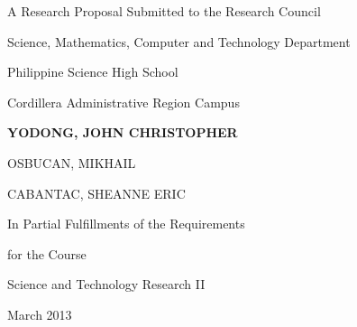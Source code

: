\makeatletter
\begin{titlepage}
\begin{center}
\textbf{\@title}

\vfill


A Research Proposal Submitted 
to the Research Council

Science, Mathematics, Computer and Technology Department

Philippine Science High School

Cordillera Administrative Region Campus

\vfill

{\bfseries
YODONG, JOHN CHRISTOPHER

OSBUCAN, MIKHAIL

CABANTAC, SHEANNE ERIC

}

\vfill

In Partial Fulfillments of the Requirements

for the Course

Science and Technology Research II

\vfill


March 2013

\end{center}
\end{titlepage}
\makeatother
\clearpage
\newpage